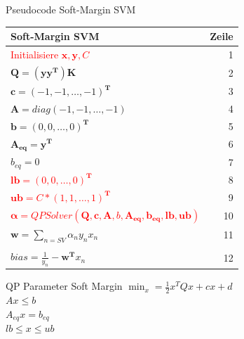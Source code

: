 \documentclass[ngerman]{beamer}
\begin{document}
\begin{frame}{Pseudocode Soft-Margin SVM}
    \centering
    \begin{tabular}{l r}
        \textbf{Soft-Margin SVM} & \textbf{Zeile} \\
        \hline
        \textcolor{red}{Initialisiere $\mathbf{x}, \mathbf{y}, C$ }& 1\\ \pause
        $\mathbf{Q} = (\mathbf{y}\mathbf{y}^{\mathbf{T}})\mathbf{K}$ & 2\\
        $\mathbf{c} = \left( -1, -1, \ldots, -1 \right)^{\mathbf{T}}$ & 3 \\
        $\mathbf{A} = diag\left( -1, -1, \ldots, -1 \right)$ & 4 \\
        $\mathbf{b} = \left( 0, 0, \ldots, 0 \right)^{\mathbf{T}}$ & 5\\
        $\mathbf{A_{eq}} = \mathbf{y}^{\mathbf{T}}$ & 6\\
        $b_{eq} = 0$ & 7\\ \pause
        \textcolor{red}{$\mathbf{lb} = \left( 0, 0, \ldots, 0 \right)^{\mathbf{T}}$} & 8 \\
        \textcolor{red}{$\mathbf{ub} = C * \left( 1, 1, \ldots, 1 \right)^{\mathbf{T}}$} & 9 \\ \pause
        \textcolor{red}{$\mathbf{\alpha} = QPSolver\left( \mathbf{Q}, \mathbf{c}, \mathbf{A}, b, \mathbf{A_{eq}}, \mathbf{b_{eq}}, \mathbf{lb}, \mathbf{ub} \right)$} & 10\\ \pause
        $\mathbf{w} = \sum\limits_{n=SV} \alpha_{n} y_{n} x_{n}$  & 11\\
        & \\[-1em]
        $bias = \frac{1}{y_{n}} - \mathbf{w}^{\mathbf{T}}x_{n}$ & 12\\
    \end{tabular}
\end{frame}

\begin{frame}{QP Parameter Soft Margin}
    \centering
    $\min_{x} = \frac{1}{2} x^{T} Q x + c x + d $ \\
    $A x \leq b$ \\
    $A_{e q} x = b_{e q}$ \\
    $lb \leq x \leq ub$
\end{frame}
\end{document}
